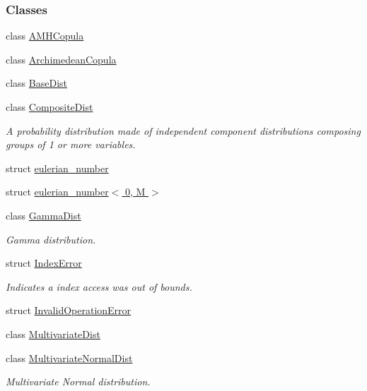 \subsubsection*{Classes}
\begin{DoxyCompactItemize}
\item 
class \hyperlink{classprior__hessian_1_1AMHCopula}{A\+M\+H\+Copula}
\item 
class \hyperlink{classprior__hessian_1_1ArchimedeanCopula}{Archimedean\+Copula}
\item 
class \hyperlink{classprior__hessian_1_1BaseDist}{Base\+Dist}
\item 
class \hyperlink{classprior__hessian_1_1CompositeDist}{Composite\+Dist}
\begin{DoxyCompactList}\small\item\em A probability distribution made of independent component distributions composing groups of 1 or more variables. \end{DoxyCompactList}\item 
struct \hyperlink{structprior__hessian_1_1eulerian__number}{eulerian\+\_\+number}
\item 
struct \hyperlink{structprior__hessian_1_1eulerian__number_3_010_00_01M_01_4}{eulerian\+\_\+number$<$ 0, M $>$}
\item 
class \hyperlink{classprior__hessian_1_1GammaDist}{Gamma\+Dist}
\begin{DoxyCompactList}\small\item\em Gamma distribution. \end{DoxyCompactList}\item 
struct \hyperlink{structprior__hessian_1_1IndexError}{Index\+Error}
\begin{DoxyCompactList}\small\item\em Indicates a index access was out of bounds. \end{DoxyCompactList}\item 
struct \hyperlink{structprior__hessian_1_1InvalidOperationError}{Invalid\+Operation\+Error}
\item 
class \hyperlink{classprior__hessian_1_1MultivariateDist}{Multivariate\+Dist}
\item 
class \hyperlink{classprior__hessian_1_1MultivariateNormalDist}{Multivariate\+Normal\+Dist}
\begin{DoxyCompactList}\small\item\em Multivariate Normal distribution. \end{DoxyCompactList}\item 

\end{DoxyCompactItemize}
